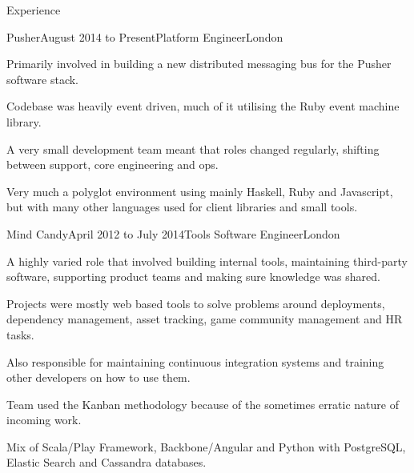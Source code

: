 \documentclass{resume} %
\begin{document}

\begin{rSection}{Experience}

  \begin{rExperience}{Pusher}{August 2014 to Present}{Platform Engineer}{London}
  \item Primarily involved in building a new distributed messaging bus for the Pusher software stack.
  \item Codebase was heavily event driven, much of it utilising the Ruby event machine library.
  \item A very small development team meant that roles changed regularly, shifting between support, core engineering and ops.
  \item Very much a polyglot environment using mainly Haskell, Ruby and Javascript, but with many other languages used for client libraries and small tools.
  \end{rExperience}


  \begin{rExperience}{Mind Candy}{April 2012 to July 2014}{Tools Software Engineer}{London}
  \item A highly varied role that involved building internal tools, maintaining third-party software, supporting product teams and making sure knowledge was shared.
  \item Projects were mostly web based tools to solve problems around deployments, dependency management, asset tracking, game community management and HR tasks.
  \item Also responsible for maintaining continuous integration systems and training other developers on how to use them.
  \item Team used the Kanban methodology because of the sometimes erratic nature of incoming work.
  \item Mix of Scala/Play Framework, Backbone/Angular and Python with PostgreSQL, Elastic Search and Cassandra databases.
  \end{rExperience}



\end{rSection}
\end{document}
